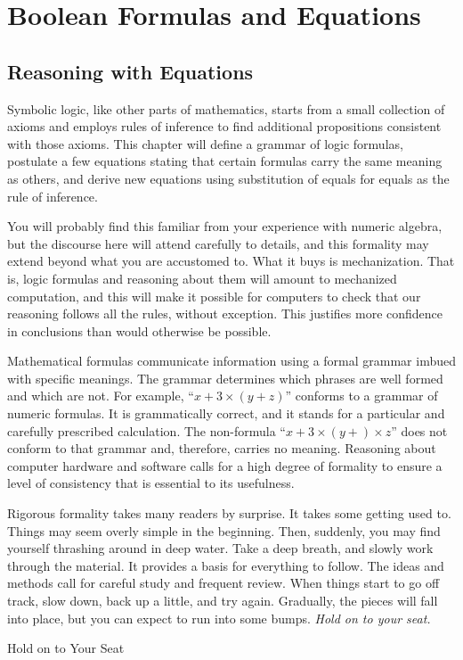\chapter{Boolean Formulas and Equations}
\label{ch:Boolean-Formulas}

\section{Reasoning with Equations}
\label{sec:math-and-equations}
Symbolic logic,
like other parts of mathematics, starts from a small
collection of axioms and employs rules of inference to find
additional propositions consistent with those axioms. This
chapter will define a grammar of logic formulas, postulate a few
equations stating that certain formulas carry the same meaning as others,
and derive new equations
using substitution of equals for equals as the rule of
inference.

You will probably find this familiar from your
experience with numeric algebra, but the discourse here will attend carefully
to details, and this formality may extend beyond what you are
accustomed to. What it buys is mechanization. That is,
logic formulas and reasoning about them will amount to
mechanized computation, and this will make it possible for
computers to check that our reasoning follows all the rules,
without exception. This justifies more confidence
in conclusions than would otherwise be possible.

\begin{aside}
Mathematical formulas communicate
information using a formal grammar imbued with specific meanings.
The grammar determines which phrases are well formed
and which are not.
For example, ``$x+3\times(y + z)$'' conforms to a grammar
of numeric formulas.
It is grammatically correct, and it stands for a
particular and carefully prescribed calculation.
The non-formula ``$x+3\times(y + ) \times z$''
does not conform to that grammar and, therefore,
carries no meaning.
Reasoning about computer hardware and software
calls for a high degree of formality to ensure
a level of consistency that is essential to  its usefulness.

Rigorous formality takes many readers by surprise.
It takes some getting used to.
Things may seem overly simple in the beginning.
Then, suddenly, you may find yourself thrashing around in deep water.
Take a deep breath, and slowly work  through the material.
It provides a basis for everything to follow.
The ideas and methods call for careful study and frequent review.
When things start to go off track,
slow down, back up a little, and try
again.
Gradually, the pieces will fall into place,
but you can expect to run into some bumps.
\emph{Hold on to your seat.}
\caption{Hold on to Your Seat}
\label{aside-hold-on-to-seat}
\end{aside}

